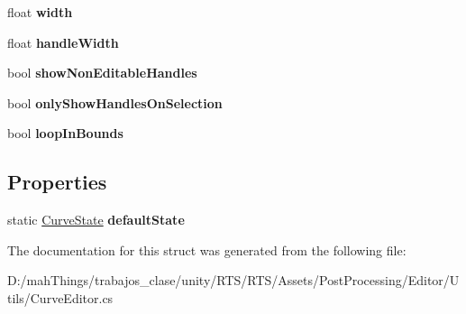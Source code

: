 \begin{DoxyCompactItemize}
float {\bfseries width}
\item 
\mbox{\label{struct_unity_editor_1_1_post_processing_1_1_curve_editor_1_1_curve_state_aa6ad60ca2b5f41ebea15dd2d3ae04ea5}} 
float {\bfseries handle\+Width}
\item 
\mbox{\label{struct_unity_editor_1_1_post_processing_1_1_curve_editor_1_1_curve_state_adec4e2428c2e0b45f2694c7e8fa27977}} 
bool {\bfseries show\+Non\+Editable\+Handles}
\item 
\mbox{\label{struct_unity_editor_1_1_post_processing_1_1_curve_editor_1_1_curve_state_ab2ec9070b560ab71548f0c78e34a7c5f}} 
bool {\bfseries only\+Show\+Handles\+On\+Selection}
\item 
\mbox{\label{struct_unity_editor_1_1_post_processing_1_1_curve_editor_1_1_curve_state_abb8b6af015fa2f97da6bc16a573f1bf7}} 
bool {\bfseries loop\+In\+Bounds}
\end{DoxyCompactItemize}
\subsection*{Properties}
\begin{DoxyCompactItemize}
\item 
\mbox{\label{struct_unity_editor_1_1_post_processing_1_1_curve_editor_1_1_curve_state_a525752786a73cecd0e5efa7ae3856e67}} 
static \mbox{\hyperlink{struct_unity_editor_1_1_post_processing_1_1_curve_editor_1_1_curve_state}{Curve\+State}} {\bfseries default\+State}
\end{DoxyCompactItemize}


The documentation for this struct was generated from the following file\+:\begin{DoxyCompactItemize}
\item 
D\+:/mah\+Things/trabajos\+\_\+clase/unity/\+R\+T\+S/\+R\+T\+S/\+Assets/\+Post\+Processing/\+Editor/\+Utils/Curve\+Editor.\+cs\end{DoxyCompactItemize}
